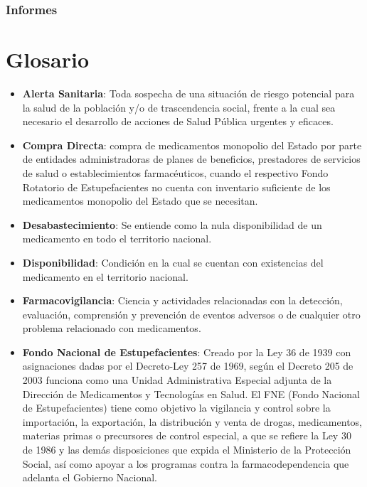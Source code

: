 \documentclass[
]{book}
\begin{document}
\hypertarget{informes}{%
\subsection{Informes}\label{informes}}

\hypertarget{glosario}{%
\chapter*{Glosario}\label{glosario}}

\begin{itemize}
\item
  \textbf{Alerta Sanitaria}: Toda sospecha de una situación de riesgo potencial para la salud de la población y/o de trascendencia social, frente a la cual sea necesario el desarrollo de acciones de Salud Pública urgentes y eficaces.
\item
  \textbf{Compra Directa}: compra de medicamentos monopolio del Estado por parte de entidades administradoras de planes de beneficios, prestadores de servicios de salud o establecimientos farmacéuticos, cuando el respectivo Fondo Rotatorio de Estupefacientes no cuenta con inventario suficiente de los medicamentos monopolio del Estado que se necesitan.
\item
  \textbf{Desabastecimiento}: Se entiende como la nula disponibilidad de un medicamento en todo el territorio nacional.
\item
  \textbf{Disponibilidad}: Condición en la cual se cuentan con existencias del medicamento en el territorio nacional.
\item
  \textbf{Farmacovigilancia}: Ciencia y actividades relacionadas con la detección, evaluación, comprensión y prevención de eventos adversos o de cualquier otro problema relacionado con medicamentos.
\item
  \textbf{Fondo Nacional de Estupefacientes}: Creado por la Ley 36 de 1939 con asignaciones dadas por el Decreto-Ley 257 de 1969, según el Decreto 205 de 2003 funciona como una Unidad Administrativa Especial adjunta de la Dirección de Medicamentos y Tecnologías en Salud. El FNE (Fondo Nacional de Estupefacientes) tiene como objetivo la vigilancia y control sobre la importación, la exportación, la distribución y venta de drogas, medicamentos, materias primas o precursores de control especial, a que se refiere la Ley 30 de 1986 y las demás disposiciones que expida el Ministerio de la Protección Social, así como apoyar a los programas contra la farmacodependencia que adelanta el Gobierno Nacional.

\end{itemize}
\end{document}
